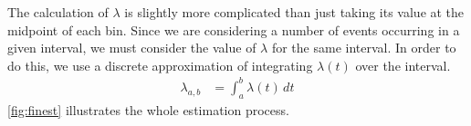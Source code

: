 \documentclass[a4paper,11pt]{article}
\begin{document}
   The calculation of $\lambda$ is slightly more complicated than just taking
   its value at the midpoint of each bin. Since we are considering a number of
   events occurring in a given interval, we must consider the value of $\lambda$
   for the same interval. In order to do this, we use a discrete approximation
   of integrating $\lambda(t)$ over the interval.
   \begin{align}
   \lambda_{a,b}&=\int_a^b\lambda(t)\,dt
   \end{align}
   \ref{fig:finest} illustrates the whole estimation process.
   \begin{figure}[]
   \\
\end{figure}
\end{document}
